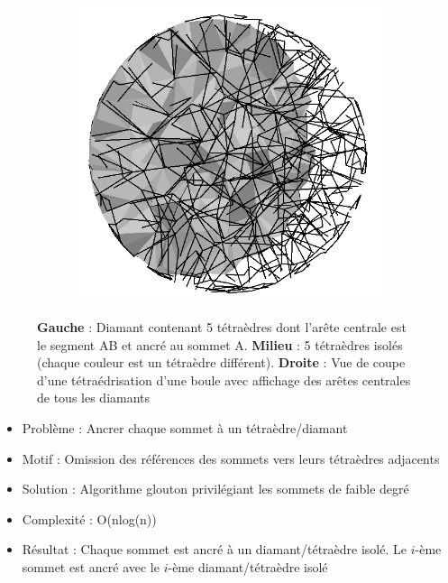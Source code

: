 \documentclass[9pt]{beamer}
\begin{document}
\begin{frame}
\begin{figure}[H]
\begin{subfigure}{.32\textwidth}
  \caption{}
  \label{fig:explosion_diamond}
\end{subfigure}
\begin{subfigure}{.32\textwidth}
  \centering
  \includegraphics[scale=0.16]{Images/central_edges}
  \caption{}
\end{subfigure}
\caption{\textbf{Gauche} : Diamant contenant 5 tétraèdres dont l'arête centrale est le segment AB et ancré au sommet A. \textbf{Milieu} : 5 tétraèdres isolés (chaque couleur est un tétraèdre différent). \textbf{Droite} : Vue de coupe d'une tétraédrisation d'une boule avec affichage des arêtes centrales de tous les diamants}
\end{figure}

\begin{block}{}
\begin{itemize}
\item Problème : Ancrer chaque sommet à un tétraèdre/diamant
\item Motif : Omission des références des sommets vers leurs tétraèdres adjacents
\item Solution : Algorithme glouton privilégiant les sommets de faible degré
\item Complexité :  O(nlog(n))
\item Résultat : Chaque sommet est ancré à un diamant/tétraèdre isolé. Le $i$-ème sommet est ancré avec le $i$-ème diamant/tétraèdre isolé
\end{itemize}
\end{block}
\end{frame}
\end{document}
